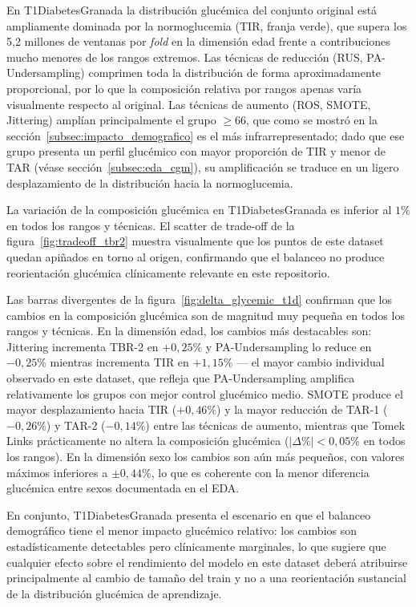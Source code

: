 En T1DiabetesGranada la distribución glucémica del conjunto original está
ampliamente dominada por la normoglucemia (TIR, franja verde), que supera
los 5{,}2 millones de ventanas por \textit{fold} en la dimensión edad frente
a contribuciones mucho menores de los rangos extremos. Las técnicas de
reducción (RUS, PA-Undersampling) comprimen toda la distribución de forma
aproximadamente proporcional, por lo que la composición relativa por rangos
apenas varía visualmente respecto al original. Las técnicas de aumento
(ROS, SMOTE, Jittering) amplían principalmente el grupo $\geq$66, que como
se mostró en la sección~\ref{subsec:impacto_demografico} es el más
infrarrepresentado; dado que ese grupo presenta un perfil glucémico con mayor
proporción de TIR y menor de TAR (véase sección~\ref{subsec:eda_cgm}), su
amplificación se traduce en un ligero desplazamiento de la distribución
hacia la normoglucemia.

La variación de la composición glucémica en T1DiabetesGranada es inferior al 
$1\%$ en todos los rangos y técnicas. El scatter de trade-off de la figura~\ref{fig:tradeoff_tbr2} muestra visualmente que los puntos de este dataset quedan apiñados en torno al origen, confirmando que el balanceo no produce reorientación glucémica clínicamente relevante en este repositorio.

Las barras divergentes de la figura~\ref{fig:delta_glycemic_t1d} confirman
que los cambios en la composición glucémica son de magnitud muy pequeña en
todos los rangos y técnicas. En la dimensión edad, los cambios más destacables
son: Jittering incrementa TBR-2 en $+0{,}25\%$ y PA-Undersampling lo reduce
en $-0{,}25\%$ mientras incrementa TIR en $+1{,}15\%$ --- el mayor cambio
individual observado en este dataset, que refleja que PA-Undersampling amplifica
relativamente los grupos con mejor control glucémico medio. SMOTE produce el
mayor desplazamiento hacia TIR ($+0{,}46\%$) y la mayor reducción de TAR-1
($-0{,}26\%$) y TAR-2 ($-0{,}14\%$) entre las técnicas de aumento, mientras
que Tomek Links prácticamente no altera la composición glucémica ($|\Delta\%|
< 0{,}05\%$ en todos los rangos). En la dimensión sexo los cambios son aún
más pequeños, con valores máximos inferiores a $\pm 0{,}44\%$, lo que es
coherente con la menor diferencia glucémica entre sexos documentada en el EDA.

En conjunto, T1DiabetesGranada presenta el escenario en que el balanceo
demográfico tiene el menor impacto glucémico relativo: los cambios son
estadísticamente detectables pero clínicamente marginales, lo que sugiere
que cualquier efecto sobre el rendimiento del modelo en este dataset deberá
atribuirse principalmente al cambio de tamaño del train y no a una
reorientación sustancial de la distribución glucémica de aprendizaje.

